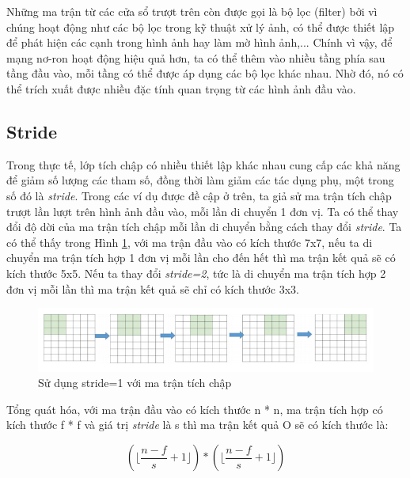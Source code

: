 \documentclass[a4paper]{article}
\begin{document}
Những ma trận từ các cửa sổ trượt trên còn được gọi là bộ lọc (filter) bởi vì chúng hoạt động như các bộ lọc trong kỹ thuật xử lý ảnh, có thể được thiết lập để phát hiện các cạnh trong hình ảnh hay làm mờ hình ảnh,... Chính vì vậy, để mạng nơ-ron hoạt động hiệu quả hơn, ta có thể thêm vào nhiều tầng phía  sau tầng đầu vào, mỗi tầng có thể được áp dụng các bộ lọc khác nhau. Nhờ đó, nó có thể trích xuất được nhiều đặc tính quan trọng từ các hình ảnh đầu vào. 

\subsection{Stride}

Trong thực tế, lớp tích chập có nhiều thiết lập khác nhau cung cấp các khả năng để giảm số lượng các tham số, đồng thời làm giảm các tác dụng phụ, một trong số đó là \textit{stride}. Trong các ví dụ được đề cập ở trên, ta giả sử ma trận tích chập trượt lần lượt trên hình ảnh đầu vào, mỗi lần di chuyển 1 đơn vị. Ta có thể thay đổi độ dời của ma trận tích chập mỗi lần di chuyển bằng cách thay đổi \textit{stride}. Ta có thể thấy trong Hình \ref{fig:stride}, với ma trận đầu vào có kích thước 7x7, nếu ta di chuyển ma trận tích hợp 1 đơn vị mỗi lần cho đến hết thì ma trận kết quả sẽ có kích thước 5x5. Nếu ta thay đổi \textit{stride=2}, tức là di chuyển ma trận tích hợp 2 đơn vị mỗi lần thì ma trận kết quả sẽ chỉ có kích thước 3x3.\par

\begin{figure}
    \centering
    \includegraphics[width=\linewidth]{image/stride.png}
	\caption{Sử dụng stride=1 với ma trận tích chập}
	\label{fig:stride}
\end{figure}

\vspace{0.35cm}

Tổng quát hóa, với ma trận đầu vào có kích thước n * n, ma trận tích hợp có kích thước f * f và giá trị \textit{stride} là s thì ma trận kết quả O sẽ có kích thước là:

\begin{equation*}
( \lfloor \frac{n-f}{s} + 1 \rfloor ) * ( \lfloor \frac{n-f}{s} + 1 \rfloor )
\end{equation*}
\end{document}
